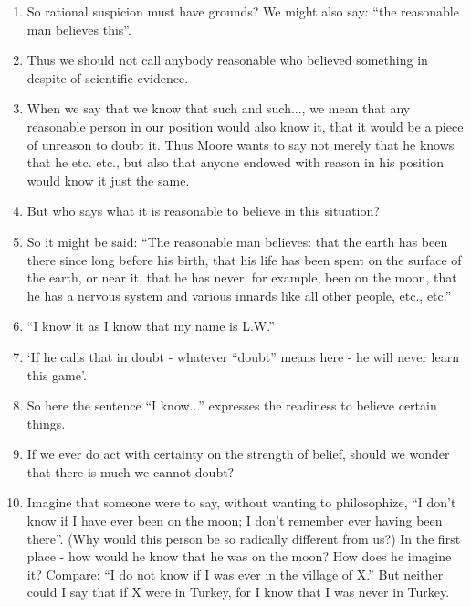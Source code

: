 \documentclass{book}
\begin{document}
\begin{enumerate}
\item
So rational suspicion must have grounds?  We might also say: ``the reasonable
man believes this''.

\item
Thus we should not call anybody reasonable who believed something in despite of
scientific evidence.

\item
When we say that we know that such and such..., we mean that any reasonable
person in our position would also know it, that it would be a piece of unreason
to doubt it. Thus Moore wants to say not merely that he knows that he etc.
etc., but also that anyone endowed with reason in his position would know it
just the same.

\item
But who says what it is reasonable to believe in this situation?

\item
So it might be said: ``The reasonable man believes: that the earth has been
there since long before his birth, that his life has been spent on the surface
of the earth, or near it, that he has never, for example, been on the moon,
that he has a nervous system and various innards like all other people, etc.,
etc.''

\item
``I know it as I know that my name is L.W.''

\item
`If he calls that in doubt - whatever ``doubt'' means here - he will never
learn this game'.

\item
So here the sentence ``I know...'' expresses the readiness to believe certain
things.

\item
If we ever do act with certainty on the strength of belief, should we wonder
that there is much we cannot doubt?

\item
Imagine that someone were to say, without wanting to philosophize, ``I don't
know if I have ever been on the moon; I don't remember ever having been
there''. (Why would this person be so radically different from us?) In the
first place - how would he know that he was on the moon? How does he imagine
it? Compare: ``I do not know if I was ever in the village of X.'' But neither
could I say that if X were in Turkey, for I know that I was never in Turkey.


\end{enumerate}
\end{document}
